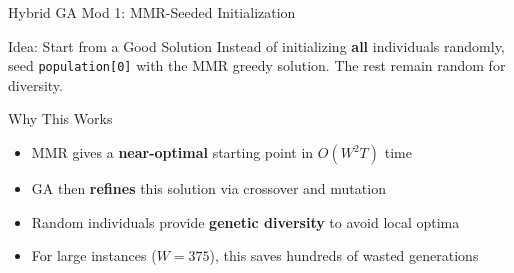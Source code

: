 \documentclass[aspectratio=43,8pt]{beamer}
\begin{document}
\begin{frame}[fragile]{Hybrid GA Mod 1: MMR-Seeded Initialization}
\begin{block}{Idea: Start from a Good Solution}
Instead of initializing \textbf{all} individuals randomly, seed \texttt{population[0]} with the MMR greedy solution. The rest remain random for diversity.
\end{block}

\vspace{0.3cm}
\begin{center}
\end{center}

\begin{exampleblock}{Why This Works}
\begin{itemize}
    \item MMR gives a \textbf{near-optimal} starting point in $O(W^2T)$ time
    \item GA then \textbf{refines} this solution via crossover and mutation
    \item Random individuals provide \textbf{genetic diversity} to avoid local optima
    \item For large instances ($W=375$), this saves hundreds of wasted generations
\end{itemize}
\end{exampleblock}
\end{frame}
\end{document}
